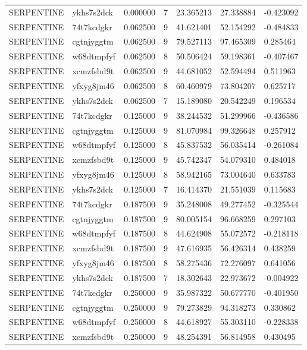 \begin{tabular}{lllllll}
SERPENTINE & ykhs7s2dck & 0.000000 & 7 & 23.365213 & 27.338884 & -0.423092 \\
SERPENTINE & 74t7kcdgkr & 0.062500 & 9 & 41.621401 & 52.154292 & -0.484833 \\
SERPENTINE & cgtnjyggtm & 0.062500 & 9 & 79.527113 & 97.465309 & 0.285464 \\
SERPENTINE & w68dtmpfyf & 0.062500 & 8 & 50.506424 & 59.198361 & -0.407467 \\
SERPENTINE & xcmzfsbd9t & 0.062500 & 9 & 44.681052 & 52.594494 & 0.511963 \\
SERPENTINE & yfxyg8jm46 & 0.062500 & 8 & 60.460979 & 73.804207 & 0.625717 \\
SERPENTINE & ykhs7s2dck & 0.062500 & 7 & 15.189080 & 20.542249 & 0.196534 \\
SERPENTINE & 74t7kcdgkr & 0.125000 & 9 & 38.244532 & 51.299966 & -0.436586 \\
SERPENTINE & cgtnjyggtm & 0.125000 & 9 & 81.070984 & 99.326648 & 0.257912 \\
SERPENTINE & w68dtmpfyf & 0.125000 & 8 & 45.837532 & 56.035414 & -0.261084 \\
SERPENTINE & xcmzfsbd9t & 0.125000 & 9 & 45.742347 & 54.079310 & 0.484018 \\
SERPENTINE & yfxyg8jm46 & 0.125000 & 8 & 58.942165 & 73.004640 & 0.633783 \\
SERPENTINE & ykhs7s2dck & 0.125000 & 7 & 16.414370 & 21.551039 & 0.115683 \\
SERPENTINE & 74t7kcdgkr & 0.187500 & 9 & 35.248008 & 49.277452 & -0.325544 \\
SERPENTINE & cgtnjyggtm & 0.187500 & 9 & 80.005154 & 96.668259 & 0.297103 \\
SERPENTINE & w68dtmpfyf & 0.187500 & 8 & 44.624908 & 55.072572 & -0.218118 \\
SERPENTINE & xcmzfsbd9t & 0.187500 & 9 & 47.616935 & 56.426314 & 0.438259 \\
SERPENTINE & yfxyg8jm46 & 0.187500 & 8 & 58.275436 & 72.276097 & 0.641056 \\
SERPENTINE & ykhs7s2dck & 0.187500 & 7 & 18.302643 & 22.973672 & -0.004922 \\
SERPENTINE & 74t7kcdgkr & 0.250000 & 9 & 35.987322 & 50.677770 & -0.401950 \\
SERPENTINE & cgtnjyggtm & 0.250000 & 9 & 79.273829 & 94.318273 & 0.330862 \\
SERPENTINE & w68dtmpfyf & 0.250000 & 8 & 44.618927 & 55.303110 & -0.228338 \\
SERPENTINE & xcmzfsbd9t & 0.250000 & 9 & 48.254391 & 56.814958 & 0.430495 \\

\end{tabular}
